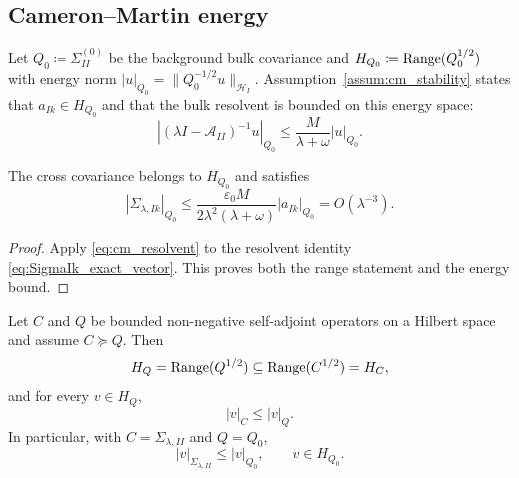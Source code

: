 \subsection{Cameron--Martin energy}

Let $Q_0\coloneqq\Sigma_{II}^{(0)}$ be the background bulk covariance and
$H_{Q_0}\coloneqq\operatorname{Range}(Q_0^{1/2})$ with energy norm
$|u|_{Q_0}=\|Q_0^{-1/2}u\|_{\mathcal{H}_I}$.  Assumption~\ref{assum:cm_stability}
states that $a_{Ik}\in H_{Q_0}$ and that the bulk resolvent is bounded on this
energy space:
\begin{equation}
  |(\lambda I-\mathcal{A}_{II})^{-1}u|_{Q_0}
  \le \frac{M}{\lambda+\omega}|u|_{Q_0}.
  \label{eq:cm_resolvent}
\end{equation}

\begin{lemma}
\label{lem:finite_energy_leakage}
The cross covariance belongs to $H_{Q_0}$ and satisfies
\begin{equation}
 |\Sigma_{\lambda,Ik}|_{Q_0}
 \le
 \frac{\varepsilon_0M}{2\lambda^2(\lambda+\omega)}
 |a_{Ik}|_{Q_0}
 =O(\lambda^{-3}).
 \label{eq:cross_energy}
\end{equation}
\end{lemma}

\begin{proof}
Apply \eqref{eq:cm_resolvent} to the resolvent identity
\eqref{eq:SigmaIk_exact_vector}.  This proves both the range statement and the
energy bound.
\end{proof}

\begin{lemma}
\label{lem:form_domain_energy_domination}
Let $C$ and $Q$ be bounded non-negative self-adjoint operators on a Hilbert
space and assume $C\succeq Q$.  Then
\begin{equation}
  H_Q=\operatorname{Range}(Q^{1/2})\subseteq \operatorname{Range}(C^{1/2})=H_C,
  \label{eq:range_inclusion_CQ}
\end{equation}
and for every $v\in H_Q$,
\begin{equation}
  |v|_C\le |v|_Q.
  \label{eq:energy_domination_CQ}
\end{equation}
In particular, with $C=\Sigma_{\lambda,II}$ and $Q=Q_0$,
\begin{equation}
  |v|_{\Sigma_{\lambda,II}}
  \le |v|_{Q_0},
  \qquad v\in H_{Q_0}.
  \label{eq:Sigma_energy_dominated_by_Q0}
\end{equation}
\end{lemma}

